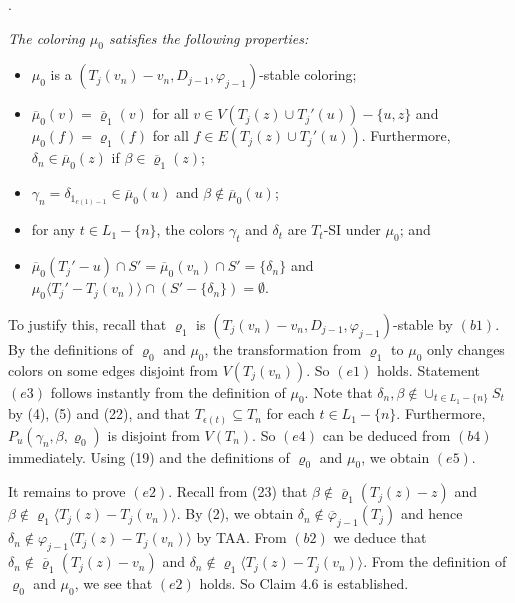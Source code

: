 \documentclass[11pt]{article}
\newcommand{\mubar}{\overline{\mu}}
\newcommand{\phibar}{\overline{\varphi}}
\begin{document}
\vskip 2mm
. {\em The coloring $\mu_0$ satisfies the following properties:  
\begin{itemize}
\vspace{-2mm}
\item[(e1)] $\mu_0$ is a $(T_j(v_n)-v_n,D_{j-1},\varphi_{j-1})$-stable coloring;
\vspace{-2mm}
\item[(e2)] $\mubar_0(v)=\overline{\varrho}_1(v)$ for all $v\in V(T_j(z)\cup T_j'(u))-\{u,z\}$ and 
$\mu_0(f)={\varrho}_1(f)$ for all $f\in E(T_j(z)\cup T_j'(u))$. Furthermore, $\delta_n\in \overline{\mu}_0(z)$
if $\beta \in \overline{\varrho}_1(z)$; 
\vspace{-2mm}		
\item[(e3)] $\gamma_n = \delta_{1_{c(1)-1}}\in \mubar_0(u)$ and $\beta\notin \mubar_0(u)$; 
\vspace{-2mm}		
\item[(e4)] for any $t\in L_1-\{n\}$, the colors $\gamma_t$ and $\delta_t$ are $T_t$-SI under $\mu_0$; and
\vspace{-2mm}		
\item[(e5)] $\overline{\mu}_0 (T_j'-u) \cap S'= \overline{\mu}_0 (v_n) \cap S' = \{\delta_n\}$ and 
$\mu_0 \langle T_j' -T_j(v_n) \rangle \cap (S'-\{\delta_n\})=\emptyset$.
\end{itemize}}	

To justify this, recall that $\varrho_1$ is $(T_{j}(v_n)-v_n,D_{j-1},\varphi_{j-1})$-stable by $(b1)$. By the definitions
of $\varrho_0$ and $\mu_0$, the transformation from $\varrho_1$ to $\mu_0$ only changes colors on some edges disjoint 
from $V(T_j(v_n))$. So $(e1)$ holds.  Statement $(e3)$ follows instantly from the definition of $\mu_0$. Note that
$\delta_n, \beta \notin \cup_{t\in L_1-\{n\}}S_t$ by (4), (5) and (22), and that $T_{\epsilon(t)} \subseteq T_n$ for each 
$t\in L_1 - \{n\}$.  Furthermore, $P_u(\gamma_n, \beta, \varrho_0)$ is disjoint from $V(T_n)$. So $(e4)$ can be deduced 
from $(b4)$ immediately. Using (19) and the definitions of $\varrho_0$ and $\mu_0$, we obtain $(e5)$. 

It remains to prove $(e2)$. Recall from (23) that $\beta\notin \overline{\varrho}_1(T_j(z)-z)$ and $\beta\notin \varrho_1\langle 
T_j(z)-T_j(v_n) \rangle $. By (2), we obtain $\delta_n\notin\phibar_{j-1}(T_j)$ and hence $\delta_n\notin 
\varphi_{j-1} \langle T_j(z)-T_j(v_n) \rangle $ by TAA. From $(b2)$ we deduce that $\delta_n\notin \overline{\varrho}_1(T_j(z)-v_n)$
and $\delta_n\notin \varrho_1 \langle T_j(z)-T_j(v_n) \rangle$.  From the definition of $\varrho_0$ and $\mu_0$, we see that $(e2)$ holds. 
So Claim 4.6 is established.
\end{document}
